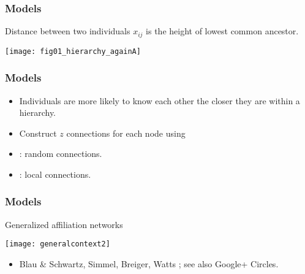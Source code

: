 \begin{frame}
  \frametitle{Models}

  \begin{block}{}
    Distance between two individuals $x_{ij}$ 
    is the height of lowest common ancestor.

    \begin{center}
      \texttt{[image: fig01\_hierarchy\_againA]}
    \end{center}

  \end{block}

\end{frame}

\begin{frame}
  \frametitle{Models}

  \begin{block}{}
    \begin{itemize}
    \item<1-> 
      Individuals are more
      likely to know each other the closer they are
      within a hierarchy.
    \item<2-> 
      Construct $z$ connections for each node
      using
    \item<3-> 
      : random connections.
    \item<4-> 
      : local connections.
    \end{itemize}
  \end{block}

\end{frame}


\begin{frame}
  \frametitle{Models}

  \begin{block}{Generalized affiliation networks}

    \medskip

    \texttt{[image: generalcontext2]}  
    \begin{itemize}
    \item Blau \& Schwartz\cite{blau1984a}, Simmel\cite{simmel1902a},
      Breiger\cite{breiger1974a}, Watts \etal\cite{watts2002b}; 
      see also Google+ Circles.
    \end{itemize}
  \end{block}


\end{frame}

